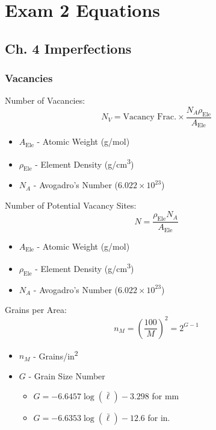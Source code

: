 \section{Exam 2 Equations}
	\subsection{Ch. 4 Imperfections}
		\subsubsection{Vacancies}
		Number of Vacancies:
			\begin{equation}
				N_{V} = \text{Vacancy Frac.} \times \frac{N_{A} \rho_{\text{Ele}}}{A_{\text{Ele}}}
			\end{equation}
			\begin{itemize}[noitemsep]
				\item $A_{\text{Ele}}$ - Atomic Weight (\si{\gram / \mole})
				\item $\rho_{\text{Ele}}$ - Element Density (\si{\gram / \cubic \centi \meter})
				\item $N_{A}$ - Avogadro's Number ($6.022 \times 10^{23}$)
			\end{itemize}
		Number of Potential Vacancy Sites:
			\begin{equation}
				N = \frac{\rho_{\text{Ele}} N_{A}}{A_{\text{Ele}}}
			\end{equation}
			\begin{itemize}[noitemsep]
				\item $A_{\text{Ele}}$ - Atomic Weight (\si{\gram / \mole})
				\item $\rho_{\text{Ele}}$ - Element Density (\si{\gram / \cubic \centi \meter})
				\item $N_{A}$ - Avogadro's Number ($6.022 \times 10^{23}$)
			\end{itemize}
		Grains per Area:
			\begin{equation}
				n_{M} = \left( \frac{100}{M} \right)^{2} = 2^{G-1}
			\end{equation}
			\begin{itemize}[noitemsep]
				\item $n_{M}$ - Grains/in\textsuperscript{2}
				\item $G$ - Grain Size Number
				\begin{itemize}[noitemsep]
					\item $G = -6.6457 \log \left( \bar{\ell} \right) - 3.298$ for \si{\milli \meter}
					\item $G = -6.6353 \log \left( \bar{\ell} \right) - 12.6$ for in.
				\end{itemize}
			\end{itemize}
		
